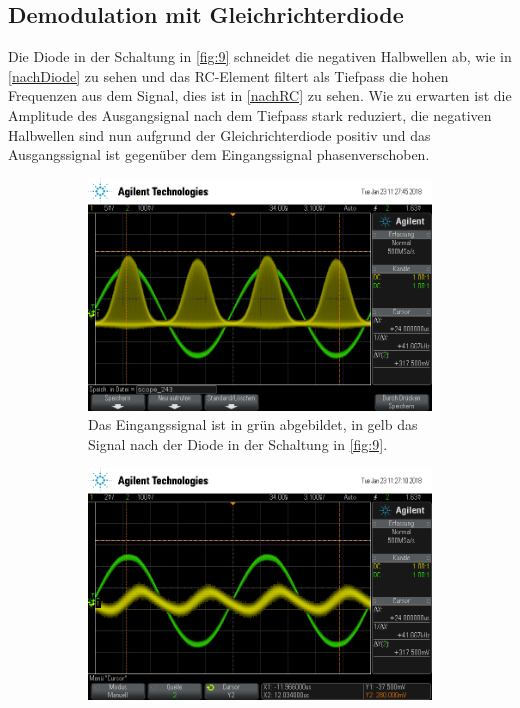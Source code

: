\subsection{Demodulation mit Gleichrichterdiode}
\label{De-AM}

Die Diode in der Schaltung in \autoref{fig:9} schneidet die negativen Halbwellen ab, wie in \autoref{nachDiode} zu sehen und das RC-Element filtert als Tiefpass die hohen Frequenzen aus dem Signal, dies ist in \autoref{nachRC} zu sehen. Wie zu erwarten ist die Amplitude des Ausgangsignal nach dem Tiefpass stark reduziert, die negativen Halbwellen sind nun aufgrund der Gleichrichterdiode positiv und das Ausgangssignal ist gegenüber dem Eingangssignal phasenverschoben.

\begin{figure}[t!]
	\centering
	\begin{subfigure}[t]{0.48\textwidth}
		\centering
		\includegraphics[width=\textwidth]{img/g_scope_243.png}
		\caption{Das Eingangssignal ist in grün abgebildet, in gelb das Signal nach der Diode in der Schaltung in \autoref{fig:9}.}
		\label{nachDiode}
	\end{subfigure}\hfill%
	\begin{subfigure}[t]{0.48\textwidth}
		\centering
		\includegraphics[width=\textwidth]{img/g_scope_242.png}

\end{subfigure}
\end{figure}
